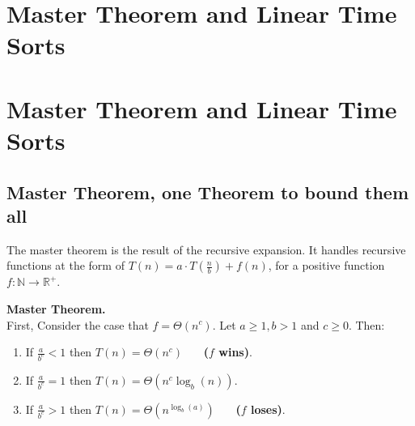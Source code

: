 


\ifdefined\BOOK
\chapter{Master Theorem and Linear Time Sorts} 
\else
\setcounter{chapter}{2}
\chapter*{Master Theorem and Linear Time Sorts} 
 \thispagestyle{firststyle}
\fi


\section{Master Theorem, one Theorem to bound them all }
The master theorem is the result of the recursive expansion. It handles recursive functions at the form of $T\left(n\right) = a\cdot T\left( \frac{n}{b} \right) + f\left(n\right) $, for a positive function $f : \mathbb{N} \rightarrow \mathbb{R}^{+} $.       

\begin{framed} \noindent \textbf{Master Theorem.}\\
  First, Consider the case that $f = \Theta(n^c)$. Let $ a \ge 1, b > 1$ and $ c \ge 0 $. Then: 
\begin{enumerate}
    \item If $\frac{a}{b^c} < 1 $ then $ T\left(n\right) = \Theta \left( n^c \right) $ \ \ \ \textbf{($f$ wins)}.
    \item If $\frac{a}{b^c} = 1 $ then $ T\left(n\right) = \Theta \left( n^c \log_{b} \left(n\right) \right) $.
    \item If $\frac{a}{b^c} > 1 $ then $ T\left(n\right) = \Theta \left( n^{\log_{b} \left(a\right)} \right) $ \ \ \ \textbf{($f$ loses)}.
  \end{enumerate}
\end{framed}

